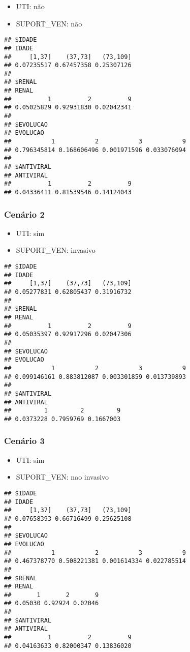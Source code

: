 \documentclass[
]{article}
\providecommand{\tightlist}{%
  \setlength{\itemsep}{0pt}\setlength{\parskip}{0pt}}
\begin{document}
\begin{itemize}
\tightlist
\item
  UTI: não
\item
  SUPORT\_VEN: não
\end{itemize}

\begin{verbatim}
## $IDADE
## IDADE
##     [1,37]    (37,73]   (73,109] 
## 0.07235517 0.67457358 0.25307126 
## 
## $RENAL
## RENAL
##          1          2          9 
## 0.05025829 0.92931830 0.02042341 
## 
## $EVOLUCAO
## EVOLUCAO
##           1           2           3           9 
## 0.796345814 0.168606496 0.001971596 0.033076094 
## 
## $ANTIVIRAL
## ANTIVIRAL
##          1          2          9 
## 0.04336411 0.81539546 0.14124043
\end{verbatim}

\hypertarget{cenuxe1rio-2}{%
\subsubsection{Cenário 2}\label{cenuxe1rio-2}}

\begin{itemize}
\tightlist
\item
  UTI: sim
\item
  SUPORT\_VEN: invasivo
\end{itemize}

\begin{verbatim}
## $IDADE
## IDADE
##     [1,37]    (37,73]   (73,109] 
## 0.05277831 0.62805437 0.31916732 
## 
## $RENAL
## RENAL
##          1          2          9 
## 0.05035397 0.92917296 0.02047306 
## 
## $EVOLUCAO
## EVOLUCAO
##           1           2           3           9 
## 0.099146161 0.883812087 0.003301859 0.013739893 
## 
## $ANTIVIRAL
## ANTIVIRAL
##         1         2         9 
## 0.0373228 0.7959769 0.1667003
\end{verbatim}

\hypertarget{cenuxe1rio-3}{%
\subsubsection{Cenário 3}\label{cenuxe1rio-3}}

\begin{itemize}
\tightlist
\item
  UTI: sim
\item
  SUPORT\_VEN: nao invasivo
\end{itemize}

\begin{verbatim}
## $IDADE
## IDADE
##     [1,37]    (37,73]   (73,109] 
## 0.07658393 0.66716499 0.25625108 
## 
## $EVOLUCAO
## EVOLUCAO
##           1           2           3           9 
## 0.467378770 0.508221381 0.001614334 0.022785514 
## 
## $RENAL
## RENAL
##       1       2       9 
## 0.05030 0.92924 0.02046 
## 
## $ANTIVIRAL
## ANTIVIRAL
##          1          2          9 
## 0.04163633 0.82000347 0.13836020
\end{verbatim}
\end{document}
